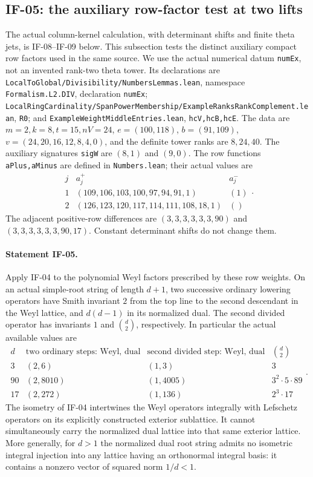 \subsection{IF-05: the auxiliary row-factor test at two lifts}
The actual column-kernel calculation, with determinant shifts and
finite theta jets, is IF-08--IF-09 below. This subsection tests the
distinct auxiliary compact row factors used in the same source.
We use the actual numerical datum \texttt{numEx}, not an invented
rank-two theta tower. Its declarations are
\texttt{LocalToGlobal/Divisibility/NumbersLemmas.lean}, namespace
\texttt{Formalism.L2.DIV}, declaration \texttt{numEx};
\texttt{LocalRingCardinality/SpanPowerMembership/ExampleRanksRankComplement.lean},
\texttt{R0}; and
\texttt{ExampleWeightMiddleEntries.lean}, \texttt{hcV,hcB,hcE}.
The data are $m=2,k=8,t=15,nV=24$, $e=(100,118)$, $b=(91,109)$,
$v=(24,20,16,12,8,4,0)$, and the definite tower ranks are $8,24,40$.
The auxiliary signatures \texttt{sigW} are $(8,1)$ and $(9,0)$.
The row functions \texttt{aPlus,aMinus} are defined in
\texttt{Numbers.lean}; their actual values are
\[
\begin{array}{c|l|l}
 j&a_j^+&a_j^-\\\hline
 1&(109,106,103,100,97,94,91,1)&(1)\\
 2&(126,123,120,117,114,111,108,18,1)&()
\end{array}.
\]
The adjacent positive-row differences are
$(3,3,3,3,3,3,90)$ and $(3,3,3,3,3,3,90,17)$.
Constant determinant shifts do not change them.

\paragraph{Statement IF-05.}
Apply IF-04 to the polynomial Weyl factors prescribed by these row
weights. On an actual simple-root string of length $d+1$, two successive
ordinary lowering operators have Smith invariant $2$ from the top line
to the second descendant in the Weyl lattice, and $d(d-1)$ in its
normalized dual. The second divided operator has invariants $1$ and
$\binom d2$, respectively. In particular the actual available values are
\[
\begin{array}{c|c|c|c}
 d&\text{two ordinary steps: Weyl, dual}
   &\text{second divided step: Weyl, dual}&\binom d2\\\hline
 3&(2,6)&(1,3)&3\\
 90&(2,8010)&(1,4005)&3^2\cdot5\cdot89\\
 17&(2,272)&(1,136)&2^3\cdot17
\end{array}.                                                   \tag{IF-05a}
\]
The isometry of IF-04 intertwines the Weyl operators integrally with
Lefschetz operators on its explicitly constructed exterior sublattice.
It cannot simultaneously carry the normalized dual lattice into that
same exterior lattice. More generally, for $d>1$ the normalized dual
root string admits no isometric integral injection into any lattice
having an orthonormal integral basis: it contains a nonzero vector of
squared norm $1/d<1$.


